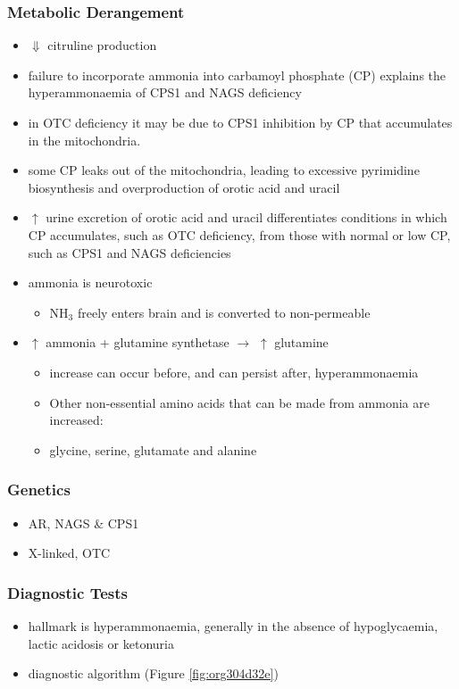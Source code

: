 \documentclass{scrartcl}
\begin{document}
\subsubsection{Metabolic Derangement}
\label{sec:org2f7d23a}
\begin{itemize}
\item \(\Downarrow\) citruline production
\item failure to incorporate ammonia into carbamoyl phosphate (CP)
explains the hyperammonaemia of CPS1 and NAGS deficiency
\item in OTC deficiency it may be due to CPS1 inhibition by CP
that accumulates in the mitochondria.
\item some CP leaks out of the mitochondria, leading to excessive
pyrimidine biosynthesis and overproduction of orotic acid and
uracil
\item \(\uparrow\) urine excretion of orotic acid and uracil differentiates
conditions in which CP accumulates, such as OTC deficiency, from
those with normal or low CP, such as CPS1 and NAGS deficiencies
\item ammonia is neurotoxic
\begin{itemize}
\item NH\(_{\text{3}}\) freely enters brain and is converted to non-permeable
\end{itemize}
\item \(\uparrow\) ammonia + glutamine synthetase \(\to\) \(\uparrow\) glutamine
\begin{itemize}
\item increase can occur before, and can persist after, hyperammonaemia
\item Other non-essential amino acids that can be made from ammonia are increased:
\item glycine, serine, glutamate and alanine
\end{itemize}
\end{itemize}

\subsubsection{Genetics}
\label{sec:org33cec5f}
\begin{itemize}
\item AR, NAGS \& CPS1
\item X-linked, OTC
\end{itemize}

\subsubsection{Diagnostic Tests}
\label{sec:orgc9b85f6}
\begin{itemize}
\item hallmark is hyperammonaemia, generally in the absence of
hypoglycaemia, lactic acidosis or ketonuria
\item diagnostic algorithm (Figure \ref{fig:org304d32e})
\end{itemize}
\end{document}
